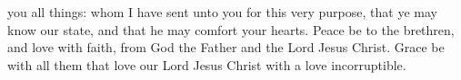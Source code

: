 you all things: whom I have sent unto you for this very purpose, that ye may know our state, and that he may comfort your hearts.  Peace be to the brethren, and love with faith, from God the Father and the Lord Jesus Christ. Grace be with all them that love our Lord Jesus Christ with a love incorruptible. 